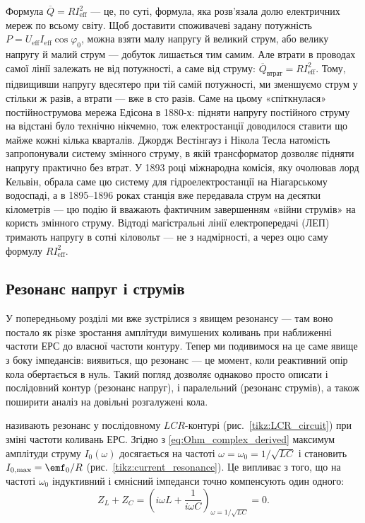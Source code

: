 \begin{Attention}
	Формула $\overline{Q} = RI_{\text{eff}}^2$ --- це, по суті, формула, яка розв'язала долю електричних мереж по всьому світу. Щоб доставити споживачеві задану потужність $P = U_{\text{eff}}I_{\text{eff}}\cos\varphi_0$, можна взяти малу напругу й великий струм, або велику напругу й малий струм --- добуток лишається тим самим. Але втрати в проводах самої лінії залежать не від потужності, а саме від струму: $\overline{Q}_{\text{втрат}} = RI_{\text{eff}}^2$. Тому, підвищивши напругу вдесятеро при тій самій потужності, ми зменшуємо струм у стільки ж разів, а втрати --- вже в сто разів. Саме на цьому «спіткнулася» постійнострумова мережа Едісона в 1880-х: підняти напругу постійного струму на відстані було технічно нікчемно, тож електростанції доводилося ставити що майже кожні кілька кварталів. Джордж Вестінгауз і Нікола Тесла натомість запропонували систему змінного струму, в якій трансформатор дозволяє підняти напругу практично без втрат. У 1893 році міжнародна комісія, яку очолював лорд Кельвін, обрала саме цю систему для гідроелектростанції на Ніагарському водоспаді, а в 1895--1896 роках станція вже передавала струм на десятки кілометрів --- цю подію й вважають фактичним завершенням «війни струмів» на користь змінного струму. Відтоді магістральні лінії електропередачі (ЛЕП) тримають напругу в сотні кіловольт --- не з надмірності, а через оцю саму формулу $RI_{\text{eff}}^2$.
\end{Attention}

\subsection*{Резонанс напруг і струмів}\label{sec:ac_resonance}

У попередньому розділі ми вже зустрілися з явищем резонансу --- там воно постало як різке зростання амплітуди вимушених коливань при наближенні частоти ЕРС до власної частоти контуру. Тепер ми подивимося на це саме явище з боку імпедансів: виявиться, що резонанс --- це момент, коли реактивний опір кола обертається в нуль. Такий погляд дозволяє однаково просто описати і послідовний контур (резонанс напруг), і паралельний (резонанс струмів), а також поширити аналіз на довільні розгалужені кола.


 називають резонанс у послідовному
$LCR$-кон\-ту\-рі (рис.~\ref{tikz:LCR_circuit}) при зміні частоти коливань ЕРС. Згідно з \eqref{eq:Ohm_complex_derived} максимум амплітуди струму $I_0(\omega)$ досягається на частоті $\omega = \omega_0 = 1/\sqrt{LC}$ і становить $I_{0,\max} = \emf_0/R$ (рис.~\ref{tikz:current_resonance}). Це випливає з того, що на частоті $\omega_0$ індуктивний і ємнісний імпеданси точно компенсують один одного:
\begin{equation}\label{eq:impedance_compensation_2}
	Z_L + Z_C = \left(i\omega L + \frac{1}{i\omega C}\right)_{\omega = 1/\sqrt{LC}} = 0.
\end{equation}

